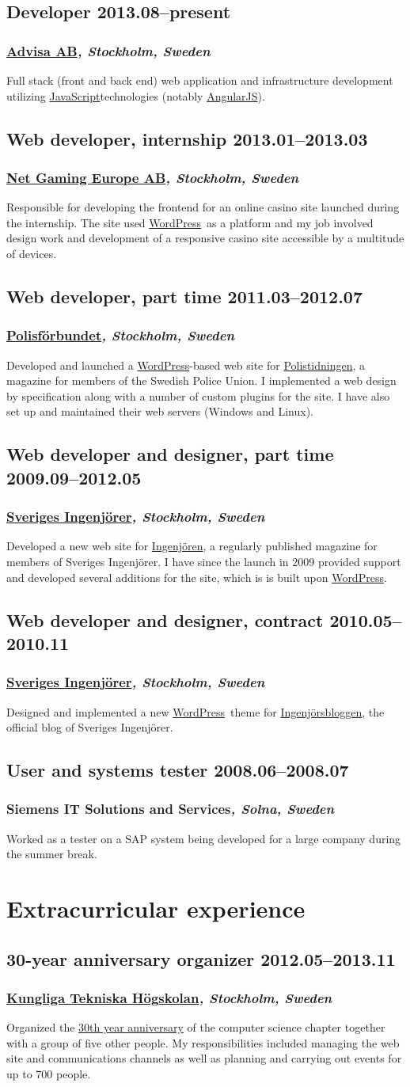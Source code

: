 \documentclass[a4paper,11pt]{article}
\newcommand{\thework}[2]{
  \subsection*{\textbf{#1} \hfill \textbf{#2}}\par%
}
\newcommand{\theplace}[2][]{%
  \subsubsection*{\textbf{#2}\textsl{#1}}%
}
\def\angularjs{\href{http://angularjs.org}{AngularJS}}
\def\javascript{\href{http://en.wikipedia.org/wiki/JavaScript}{JavaScript}}
\def\wordpress{\href{http://wordpress.org}{WordPress}}
\begin{document}
\thework{Developer}{2013.08--present}
\theplace[, Stockholm, Sweden]{\href{http://www.advisa.se}{Advisa AB}}
Full stack (front and back end) web application and infrastructure development
utilizing \javascript technologies (notably \angularjs).

\thework{Web developer, internship}{2013.01--2013.03}
\theplace[, Stockholm, Sweden]{\href{http://www.netgaming.se}{Net Gaming Europe AB}}
Responsible for developing the frontend for an online casino site launched
during the internship. The site used \wordpress\ as a platform and my job
involved design work and development of a responsive casino site accessible by
a multitude of devices.

\thework{Web developer, part time}{2011.03--2012.07}
\theplace[, Stockholm, Sweden]{\href{http://www.polisforbundet.se}{Polisförbundet}}
Developed and launched a \wordpress-based web site for
\href{http://www.polistidningen.se}{Polistidningen}, a magazine for members of
the \mbox{Swedish} Police Union. I implemented a web design by specification
along with a number of custom plugins for the site. I have also set up and
maintained their web servers (Windows and Linux).

\thework{Web developer and designer, part time}{2009.09--2012.05}
\theplace[, Stockholm, Sweden]{\href{http://www.sverigesingenjorer.se}{Sveriges Ingenjörer}}
Developed a new web site for \href{http://www.ingenjoren.se}{Ingenjören}, a
regularly published magazine for members of Sveriges Ingenjörer. I have since
the launch in 2009 provided support and developed several additions for the
site, which is is built upon \wordpress.

\thework{Web developer and designer, contract}{2010.05--2010.11}
\theplace[, Stockholm, Sweden]{\href{http://www.sverigesingenjorer.se}{Sveriges Ingenjörer}}
Designed and implemented a new \wordpress\ theme for
\href{http://www.ingenjorsbloggen.se}{Ingenjörsbloggen}, the official blog of
Sveriges Ingenjörer.

\thework{User and systems tester}{2008.06--2008.07}
\theplace[, Solna, Sweden]{Siemens IT Solutions and Services}
Worked as a tester on a SAP system being developed for a large company during
the summer break.

\section*{Extracurricular experience}%

\thework{30-year anniversary organizer}{2012.05--2013.11}
\theplace[, Stockholm, Sweden]{\href{http://kth.se}{Kungliga Tekniska Högskolan}}
Organized the \href{http://djubileet.se/}{30th year anniversary} of the
computer science chapter together with a group of five other people. My
responsibilities included managing the web site and communications channels as
well as planning and carrying out events for up to 700 people.
\end{document}
